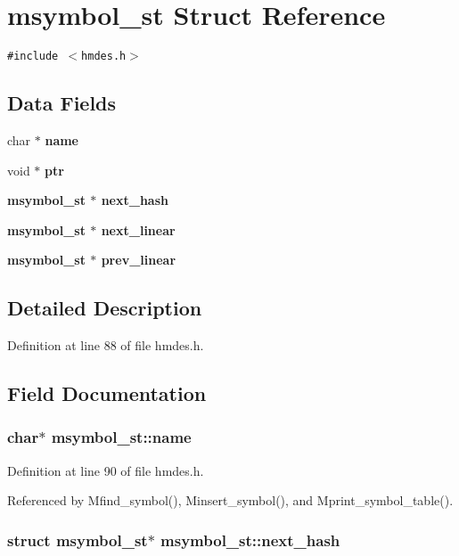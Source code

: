 \section{msymbol\_\-st Struct Reference}
\label{structmsymbol__st}
{\tt \#include $<$hmdes.h$>$}

\subsection*{Data Fields}
\begin{CompactItemize}
\item 
char $\ast$ \bf{name}
\item 
void $\ast$ \bf{ptr}
\item 
\bf{msymbol\_\-st} $\ast$ \bf{next\_\-hash}
\item 
\bf{msymbol\_\-st} $\ast$ \bf{next\_\-linear}
\item 
\bf{msymbol\_\-st} $\ast$ \bf{prev\_\-linear}
\end{CompactItemize}


\subsection{Detailed Description}




Definition at line 88 of file hmdes.h.

\subsection{Field Documentation}
\subsubsection{\setlength{\rightskip}{0pt plus 5cm}char$\ast$ \bf{msymbol\_\-st::name}}\label{structmsymbol__st_d64f14bf72b7b9b601133c68d6b2dd83}




Definition at line 90 of file hmdes.h.

Referenced by Mfind\_\-symbol(), Minsert\_\-symbol(), and Mprint\_\-symbol\_\-table().
\subsubsection{\setlength{\rightskip}{0pt plus 5cm}struct \bf{msymbol\_\-st}$\ast$ \bf{msymbol\_\-st::next\_\-hash}}\label{structmsymbol__st_38faf14b10f3deb00c1c33852b3e55e8}




